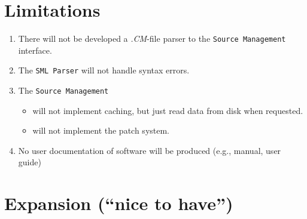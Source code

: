 \documentclass[a4paper,oneside]{memoir}
\begin{document}
\section{Limitations}

\begin{enumerate}
\item There will not be developed a \textit{.CM}-file parser to the
  \texttt{Source Management} interface.

\item The \texttt{SML Parser} will not handle syntax errors. 

\item The \texttt{Source Management} 

  \begin{itemize}
  \item will not implement caching, but just read data from disk when requested.

  \item will not implement the patch system.
  \end{itemize}

\item No user documentation of software will be produced (e.g., manual, user guide)
\end{enumerate}


\section{Expansion (``nice to have'')}
\end{document}
